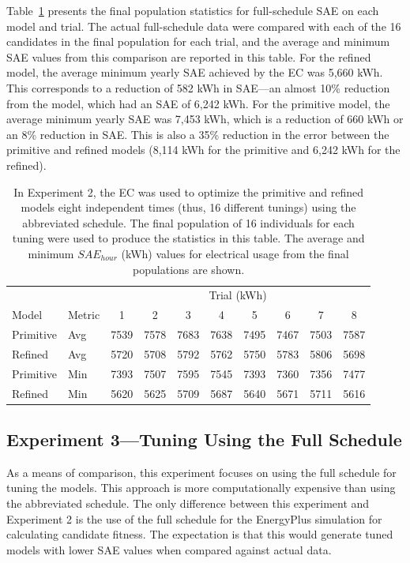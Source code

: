 \documentclass[preprint, review, 12pt]{elsarticle}
\begin{document}
Table~\ref{tab:hourly-abbrev} presents the final population statistics for full-schedule SAE on each model and trial. The actual full-schedule data were compared with each of the 16 candidates in the final population for each trial, and the average and minimum SAE values from this comparison are reported in this table. For the refined model, the average minimum yearly SAE achieved by the EC was 5,660 kWh. This corresponds to a reduction of 582 kWh in SAE---an almost 10\% reduction from the model, which had an SAE of 6,242 kWh. For the primitive model, the average minimum yearly SAE was 7,453 kWh, which is a reduction of 660 kWh or an 8\% reduction in SAE. This is also a 35\% reduction in the error between the primitive and refined models (8,114 kWh for the primitive and 6,242 kWh for the refined).


\begin{table}[htbp]
\centering
\caption{In Experiment 2, the EC was used to optimize the primitive and refined models eight independent times (thus, 16 different tunings) using the abbreviated schedule. The final population of 16 individuals for each tuning were used to produce the statistics in this table. The average and minimum $SAE_{hour}$ (kWh) values for electrical usage from the final populations are shown.}
\label{tab:hourly-abbrev}
\begin{tabular}{llcccccccc}
\toprule
 &  & \multicolumn{8}{c}{Trial (kWh)}\\
Model & Metric & 1 & 2 & 3 & 4 & 5 & 6 & 7 & 8\\
\midrule
Primitive & Avg & 7539 & 7578 & 7683 & 7638 & 7495 & 7467 & 7503 & 7587\\\rowcolor{DarkRow}
Refined   & Avg & 5720 & 5708 & 5792 & 5762 & 5750 & 5783 & 5806 & 5698\\
Primitive & Min & 7393 & 7507 & 7595 & 7545 & 7393 & 7360 & 7356 & 7477\\\rowcolor{DarkRow}
Refined   & Min & 5620 & 5625 & 5709 & 5687 & 5640 & 5671 & 5711 & 5616\\
\bottomrule
\end{tabular}
\end{table}


\subsection{Experiment 3---Tuning Using the Full Schedule}
\label{sub:experiment3}
As a means of comparison, this experiment focuses on using the full schedule for tuning the models. This approach is more computationally expensive than using the abbreviated schedule. The only difference between this experiment and Experiment 2 is the use of the full schedule for the EnergyPlus simulation for calculating candidate fitness. The expectation is that this would generate tuned models with lower SAE values when compared against actual data.
\end{document}
